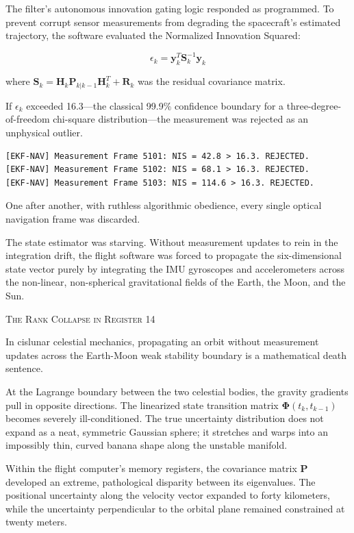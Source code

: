 \documentclass[12pt,twoside,openright]{book}
\newcommand{\sceneheader}[1]{%
  \par\vspace{1.8em}%
  {\noindent\centering\scshape\large #1\par}%
  \vspace{1.0em}%
  \noindent%
}
\newcommand{\dinkus}{%
  \par\vspace{1.2em}%
  {\noindent\centering{\large $\ast\quad\ast\quad\ast$}\par}%
  \vspace{1.2em}%
  \noindent%
}
\begin{document}
The filter's autonomous innovation gating logic responded as programmed.
To prevent corrupt sensor measurements from degrading the spacecraft's
estimated trajectory, the software evaluated the Normalized Innovation
Squared:

\[\epsilon_k = \mathbf{y}_k^T \mathbf{S}_k^{-1} \mathbf{y}_k\]

where
\(\mathbf{S}_k = \mathbf{H}_k \mathbf{P}_{k|k-1} \mathbf{H}_k^T + \mathbf{R}_k\)
was the residual covariance matrix.

If \(\epsilon_k\) exceeded 16.3---the classical 99.9\% confidence
boundary for a three-degree-of-freedom chi-square distribution---the
measurement was rejected as an unphysical outlier.

\begin{lstlisting}
[EKF-NAV] Measurement Frame 5101: NIS = 42.8 > 16.3. REJECTED.
[EKF-NAV] Measurement Frame 5102: NIS = 68.1 > 16.3. REJECTED.
[EKF-NAV] Measurement Frame 5103: NIS = 114.6 > 16.3. REJECTED.
\end{lstlisting}

One after another, with ruthless algorithmic obedience, every single
optical navigation frame was discarded.

The state estimator was starving. Without measurement updates to rein in
the integration drift, the flight software was forced to propagate the
six-dimensional state vector purely by integrating the IMU gyroscopes
and accelerometers across the non-linear, non-spherical gravitational
fields of the Earth, the Moon, and the Sun.

\dinkus

\sceneheader{The Rank Collapse in Register
14}

In cislunar celestial mechanics, propagating an orbit without
measurement updates across the Earth-Moon weak stability boundary is a
mathematical death sentence.

At the Lagrange boundary between the two celestial bodies, the gravity
gradients pull in opposite directions. The linearized state transition
matrix \(\mathbf{\Phi}(t_k, t_{k-1})\) becomes severely ill-conditioned.
The true uncertainty distribution does not expand as a neat, symmetric
Gaussian sphere; it stretches and warps into an impossibly thin, curved
banana shape along the unstable manifold.

Within the flight computer's memory registers, the covariance matrix
\(\mathbf{P}\) developed an extreme, pathological disparity between its
eigenvalues. The positional uncertainty along the velocity vector
expanded to forty kilometers, while the uncertainty perpendicular to the
orbital plane remained constrained at twenty meters.
\end{document}
